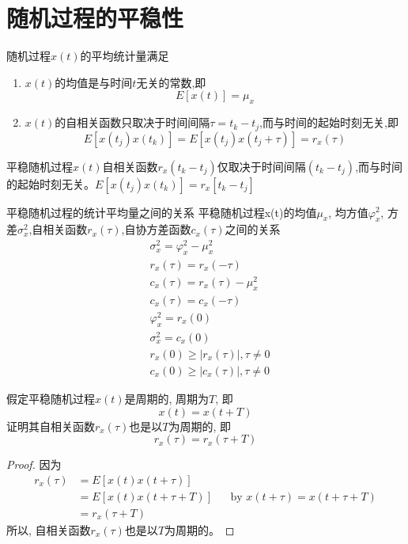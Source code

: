 \section{随机过程的平稳性}

\begin{frame}
\begin{definition}
随机过程$x(t)$的平均统计量满足
\begin{enumerate}
\item $x(t)$的均值是与时间$t$无关的常数,即
\[E[x(t)]=\mu_x\]
\item $x(t)$的自相关函数只取决于时间间隔$\tau=t_k-t_j$,而与时间的起始时刻无关,即
\[E[x(t_j)x(t_k)]=E[x(t_j)x(t_j+\tau)]=r_x(\tau) \]
\end{enumerate}
\end{definition}
平稳随机过程$x(t)$自相关函数$r_x(t_k-t_j)$仅取决于时间间隔$(t_k-t_j)$,而与时间的起始时刻无关。$E[x(t_j)x(t_k)]=r_x[t_k-t_j]$
\end{frame}

\begin{frame}{平稳随机过程的统计平均量之间的关系}
平稳随机过程x(t)的均值$\mu_x$, 均方值$\varphi_x^2$, 方差$\sigma_x^2$,自相关函数$r_x(\tau)$,自协方差函数$c_x(\tau)$之间的关系
\begin{align*}
&\sigma_x^2=\varphi_x^2-\mu_x^2\\
&r_x(\tau)=r_x(-\tau)\\
&c_x(\tau)=r_x(\tau)-\mu_x^2\\
&c_x(\tau)=c_x(-\tau)\\
&\varphi_x^2=r_x(0)\\
&\sigma_x^2=c_x(0)\\
&r_x(0)\ge|r_x(\tau)|, \tau\ne 0\\
&c_x(0)\ge|c_x(\tau)|, \tau\ne 0
\end{align*}
\end{frame}

\begin{frame}[shrink]
\begin{example}
	假定平稳随机过程$x(t)$是周期的, 周期为$T$, 即
	\[x(t)=x(t+T) \]
	证明其自相关函数$r_x(\tau)$也是以$T$为周期的, 即
	\[r_x(\tau)=r_x(\tau+T) \]
\end{example}
\begin{proof}
	因为
	\begin{align*}
	r_x(\tau)&=E[x(t)x(t+\tau)]\\
	&=E[x(t)x(t+\tau+T)]&& \text{by } x(t+\tau)=x(t+\tau+T)\\
	&=r_x(\tau+T)
	\end{align*}
	所以, 自相关函数$r_x(\tau)$也是以$T$为周期的。
\end{proof}
\end{frame}

